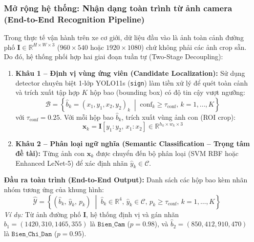 \subsubsection{Mở rộng hệ thống: Nhận dạng toàn trình từ ảnh camera (End-to-End Recognition Pipeline)}
\label{subsubsec:e2e_recognition_pipeline}

Trong thực tế vận hành trên xe cơ giới, dữ liệu đầu vào là ảnh toàn cảnh đường phố $\mathbf{I} \in \mathbb{R}^{H \times W \times 3}$ ($960 \times 540$ hoặc $1920 \times 1080$) chứ không phải các ảnh crop sẵn. Do đó, hệ thống phối hợp hai giai đoạn tuần tự (Two-Stage Decoupling):

\begin{enumerate}
    \item \textbf{Khâu 1 -- Định vị vùng ứng viên (Candidate Localization):} Sử dụng detector chuyên biệt 1-lớp YOLO11s (\texttt{sign}) làm tiền xử lý để quét toàn cảnh và trích xuất tập hợp $K$ hộp bao (bounding box) có độ tin cậy vượt ngưỡng:
    \begin{equation}
        \mathcal{B} = \left\{ \hat{b}_k = (x_1, y_1, x_2, y_2)_k \;\middle|\; \text{conf}_k \ge \tau_{\text{conf}}, \, k = 1, \dots, K \right\}
        \label{eq:localization}
    \end{equation}
    với $\tau_{\text{conf}} = 0.25$. Với mỗi hộp bao $\hat{b}_k$, trích xuất vùng ảnh con (ROI crop):
    \begin{equation}
        \mathbf{x}_k = \mathbf{I}[y_1 : y_2, \, x_1 : x_2] \in \mathbb{R}^{h_k \times w_k \times 3}
        \label{eq:crop}
    \end{equation}

    \item \textbf{Khâu 2 -- Phân loại ngữ nghĩa (Semantic Classification -- Trọng tâm đề tài):} Từng ảnh con $\mathbf{x}_k$ được chuyển đến bộ phân loại (SVM RBF hoặc Enhanced LeNet-5) để xác định nhãn $\hat{y}_k \in \mathcal{C}$.
\end{enumerate}

\textbf{Đầu ra toàn trình (End-to-End Output):} Danh sách các hộp bao kèm nhãn nhóm tương ứng của khung hình:
\begin{equation}
    \hat{\mathcal{Y}} = \left\{ \left( \hat{b}_k, \, \hat{y}_k, \, p_k \right) \;\middle|\; \hat{b}_k \in \mathbb{R}^4, \, \hat{y}_k \in \mathcal{C}, \, p_k \ge \tau_{\text{conf}}, \, k = 1, \dots, K \right\}
    \label{eq:output_formulation}
\end{equation}
\textit{Ví dụ:} Từ ảnh đường phố $\mathbf{I}$, hệ thống định vị và gán nhãn $\hat{b}_1 = (1420, 310, 1465, 355)$ là $\texttt{Bien\_Cam}$ ($p=0.98$), và $\hat{b}_2 = (850, 412, 910, 470)$ là $\texttt{Bien\_Chi\_Dan}$ ($p=0.95$).

